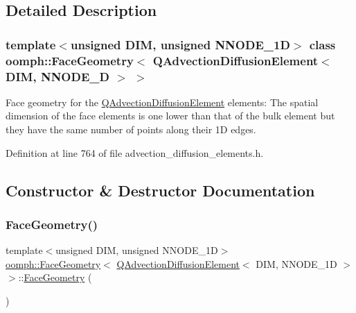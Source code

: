 \subsection{Detailed Description}
\subsubsection*{template$<$unsigned D\+IM, unsigned N\+N\+O\+D\+E\+\_\+1D$>$\newline
class oomph\+::\+Face\+Geometry$<$ Q\+Advection\+Diffusion\+Element$<$ D\+I\+M, N\+N\+O\+D\+E\+\_\+D $>$ $>$}

Face geometry for the \hyperlink{classoomph_1_1QAdvectionDiffusionElement}{Q\+Advection\+Diffusion\+Element} elements\+: The spatial dimension of the face elements is one lower than that of the bulk element but they have the same number of points along their 1D edges. 

Definition at line 764 of file advection\+\_\+diffusion\+\_\+elements.\+h.



\subsection{Constructor \& Destructor Documentation}
\mbox{\label{classoomph_1_1FaceGeometry_3_01QAdvectionDiffusionElement_3_01DIM_00_01NNODE__1D_01_4_01_4_a89cd6c140e9280133ee246a1dc64a4cc}} 
\subsubsection{\texorpdfstring{Face\+Geometry()}{FaceGeometry()}}
{\footnotesize\ttfamily template$<$unsigned D\+IM, unsigned N\+N\+O\+D\+E\+\_\+1D$>$ \\
\hyperlink{classoomph_1_1FaceGeometry}{oomph\+::\+Face\+Geometry}$<$ \hyperlink{classoomph_1_1QAdvectionDiffusionElement}{Q\+Advection\+Diffusion\+Element}$<$ D\+IM, N\+N\+O\+D\+E\+\_\+1D $>$ $>$\+::\hyperlink{classoomph_1_1FaceGeometry}{Face\+Geometry} (\begin{DoxyParamCaption}{ }\end{DoxyParamCaption})\hspace{0.3cm}{\ttfamily [inline]}}



